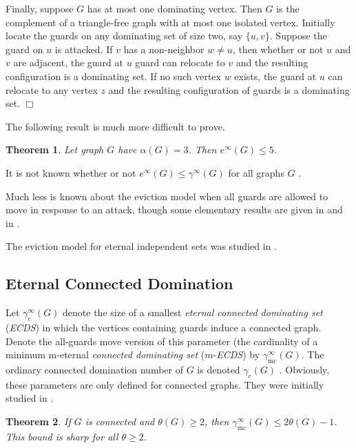 \documentclass[12pt]{article}%
\newtheorem{theorem}{Theorem}[section]
\begin{document}
Finally, suppose $G$ has at most one dominating vertex. Then $G$ is the
complement of a triangle-free graph with at most one isolated vertex.
Initially locate the guards on any dominating set of size two, say $\{u, v\}$.
Suppose the guard on $u$ is attacked. If $v$ has a non-neighbor $w \neq u$,
then whether or not $u$ and $v$ are adjacent, the guard at $u$ guard can
relocate to $v$ and the resulting configuration is a dominating set. If no
such vertex $w$ exists, the guard at $u$ can relocate to any vertex $z$ and
the resulting configuration of guards is a dominating set. $\Box$

\medskip

The following result is much more difficult to prove.

\begin{theorem}
\emph{\cite{KLM}} Let graph $G$ have $\alpha(G)=3$. Then $e^{\infty}(G)\leq5$.
\end{theorem}

It is not known whether or not $e^{\infty}(G)\leq\gamma^{\infty}(G)$ for all
graphs $G$ \cite{KLM}.

Much less is known about the eviction model when all guards are allowed to
move in response to an attack, though some elementary results are given in
\cite{KLM} and in \cite{KMe}.

The eviction model for eternal independent sets was studied in \cite{CK}.

\subsection{Eternal Connected Domination}

Let $\gamma_{c}^{\infty}(G)$ denote the size of a smallest \emph{eternal
connected dominating set }(\emph{ECDS}) in which the vertices containing
guards induce a connected graph. Denote the all-guards move version of this
parameter (the cardinality of a minimum m-eternal\emph{ connected dominating
set} ($m$-\emph{ECDS}) by $\gamma_{\mathrm{\operatorname{mc}}}^{\infty}(G)$.
The ordinary connected domination number of $G$ is denoted $\gamma_{c}(G)$
\cite{HHS}. Obviously, these parameters are only defined for connected graphs.
They were initially studied in \cite{KM4}.

\begin{theorem}
\emph{\cite{KM4}\hspace{0.1in}}If $G$ is connected and $\theta(G)\geq2$, then
$\gamma_{\mathrm{mc}}^{\infty}(G)\leq2\theta(G)-1$. This bound is sharp for
all $\theta\geq2$.
\end{theorem}
\end{document}
